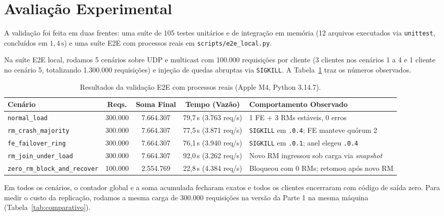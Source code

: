 \documentclass[12pt]{article}
\begin{document}
\section{Avaliação Experimental}

A validação foi feita em duas frentes: uma suíte de 105 testes unitários e de integração em memória (12 arquivos executados via \texttt{unittest}, concluídos em $1{,}4\,\text{s}$) e uma suíte E2E com processos reais em \texttt{scripts/e2e\_local.py}.

Na suíte E2E local, rodamos 5 cenários sobre UDP e multicast com 100.000 requisições por cliente (3 clientes nos cenários 1 a 4 e 1 cliente no cenário 5, totalizando 1.300.000 requisições) e injeção de quedas abruptas via \texttt{SIGKILL}. A Tabela~\ref{tab:e2e} traz os números observados.

\begin{table}[H]
\centering
\caption{Resultados da validação E2E com processos reais (Apple M4, Python 3.14.7).}
\label{tab:e2e}
\footnotesize
\begin{tabularx}{\textwidth}{l c c c X}
\toprule
\textbf{Cenário} & \textbf{Reqs.} & \textbf{Soma Final} & \textbf{Tempo (Vazão)} & \textbf{Comportamento Observado} \\
\midrule
\texttt{normal\_load} & 300.000 & 7.664.307 & 79,7\,s (3.763 req/s) & 1 FE + 3 RMs estáveis, 0 erros \\
\texttt{rm\_crash\_majority} & 300.000 & 7.664.307 & 77,5\,s (3.871 req/s) & \texttt{SIGKILL} em \texttt{.0.4}; FE manteve quórum 2 \\
\texttt{fe\_failover\_ring} & 300.000 & 7.664.307 & 76,1\,s (3.940 req/s) & \texttt{SIGKILL} em \texttt{.0.1}; anel elegeu \texttt{.0.4} \\
\texttt{rm\_join\_under\_load} & 300.000 & 7.664.307 & 92,0\,s (3.262 req/s) & Novo RM ingressou sob carga via \textit{snapshot} \\
\texttt{zero\_rm\_block\_and\_recover} & 100.000 & 2.554.769 & 22,8\,s (4.384 req/s) & Bloqueou com 0 RMs; retomou após novo RM \\
\bottomrule
\end{tabularx}
\end{table}

Em todos os cenários, o contador global e a soma acumulada fecharam exatos e todos os clientes encerraram com código de saída zero. Para medir o custo da replicação, rodamos a mesma carga de 300.000 requisições na versão da Parte 1 na mesma máquina (Tabela~\ref{tab:comparativo}).
\end{document}
